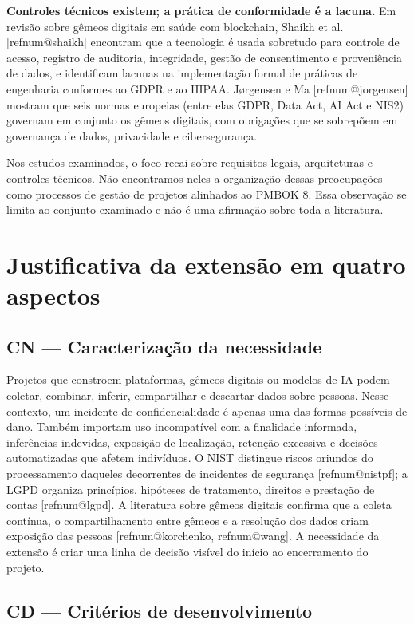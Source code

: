 \documentclass[11pt,a4paper]{article}
\makeatletter
\newcommand{\refnum}[1]{\csname refnum@#1\endcsname}
\makeatother
\begin{document}
\textbf{Controles técnicos existem; a prática de conformidade é a lacuna.} Em revisão sobre gêmeos digitais em saúde com blockchain, Shaikh et al. [\refnum{shaikh}] encontram que a tecnologia é usada sobretudo para controle de acesso, registro de auditoria, integridade, gestão de consentimento e proveniência de dados, e identificam lacunas na implementação formal de práticas de engenharia conformes ao GDPR e ao HIPAA. Jørgensen e Ma [\refnum{jorgensen}] mostram que seis normas europeias (entre elas GDPR, Data Act, AI Act e NIS2) governam em conjunto os gêmeos digitais, com obrigações que se sobrepõem em governança de dados, privacidade e cibersegurança.

Nos estudos examinados, o foco recai sobre requisitos legais, arquiteturas e controles técnicos. Não encontramos neles a organização dessas preocupações como processos de gestão de projetos alinhados ao PMBOK 8. Essa observação se limita ao conjunto examinado e não é uma afirmação sobre toda a literatura.

\section{Justificativa da extensão em quatro aspectos}
\subsection{CN — Caracterização da necessidade}

Projetos que constroem plataformas, gêmeos digitais ou modelos de IA podem coletar, combinar, inferir, compartilhar e descartar dados sobre pessoas. Nesse contexto, um incidente de confidencialidade é apenas uma das formas possíveis de dano. Também importam uso incompatível com a finalidade informada, inferências indevidas, exposição de localização, retenção excessiva e decisões automatizadas que afetem indivíduos. O NIST distingue riscos oriundos do processamento daqueles decorrentes de incidentes de segurança [\refnum{nistpf}]; a LGPD organiza princípios, hipóteses de tratamento, direitos e prestação de contas [\refnum{lgpd}]. A literatura sobre gêmeos digitais confirma que a coleta contínua, o compartilhamento entre gêmeos e a resolução dos dados criam exposição das pessoas [\refnum{korchenko}, \refnum{wang}]. A necessidade da extensão é criar uma linha de decisão visível do início ao encerramento do projeto.
\subsection{CD — Critérios de desenvolvimento}
\end{document}
